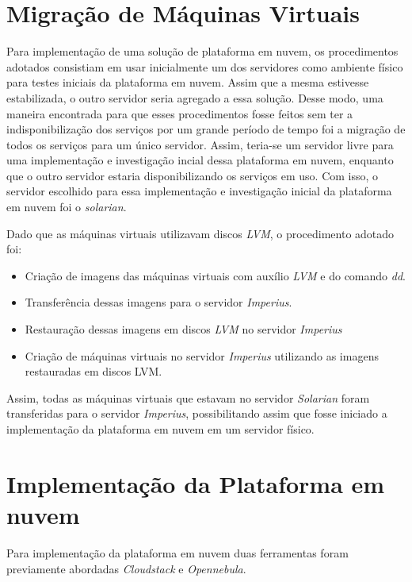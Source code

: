 \section{Migração de Máquinas Virtuais}
Para implementação de uma solução de plataforma em nuvem, os procedimentos adotados consistiam em usar inicialmente um dos servidores como ambiente físico  para testes iniciais da plataforma em nuvem. Assim que a mesma estivesse estabilizada, o outro servidor seria agregado a essa solução. Desse modo, uma maneira encontrada para que esses procedimentos fosse feitos sem ter a indisponibilização dos serviços por um grande período de tempo foi a migração de todos os serviços para um único servidor. Assim, teria-se um servidor livre para uma implementação e investigação incial dessa plataforma em nuvem, enquanto que o outro servidor estaria disponibilizando os serviços em uso. Com isso, o servidor escolhido para essa implementação e investigação inicial da plataforma em nuvem foi o \textit{solarian}. 

Dado que as máquinas virtuais utilizavam discos \textit{LVM}, o procedimento adotado foi:
\begin{itemize}
  \item Criação de imagens das máquinas virtuais com auxílio  \textit{LVM} e do comando \textit{dd}.
  \item Transferência dessas imagens para o servidor \textit{Imperius}.
  \item Restauração dessas imagens em discos \textit{LVM} no servidor \textit{Imperius}
  \item Criação de máquinas virtuais no servidor \textit{Imperius} utilizando as imagens restauradas em discos LVM.
  
\end{itemize}

Assim, todas as máquinas virtuais que estavam no servidor \textit{Solarian} foram transferidas para o servidor \textit{Imperius}, possibilitando assim que fosse iniciado a implementação da plataforma em nuvem em um servidor físico.


\section{Implementação da Plataforma em nuvem}
Para implementação da plataforma em nuvem duas ferramentas foram previamente abordadas \textit{Cloudstack} e \textit{Opennebula}. 

